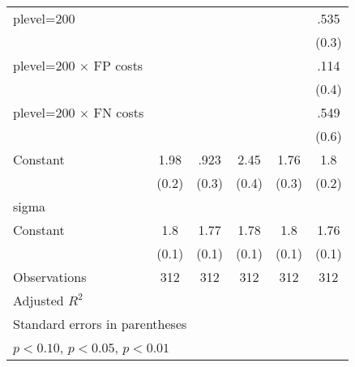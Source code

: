\begin{table}[htbp]
\begin{tabular}{l*{5}{c}}
plevel=200      &                  &                  &                  &                  &     .535\sym{*}  \\
                &                  &                  &                  &                  &    (0.3)         \\
plevel=200 $\times$ FP costs&                  &                  &                  &                  &     .114         \\
                &                  &                  &                  &                  &    (0.4)         \\
plevel=200 $\times$ FN costs&                  &                  &                  &                  &     .549         \\
                &                  &                  &                  &                  &    (0.6)         \\
Constant        &     1.98\sym{***}&     .923\sym{***}&     2.45\sym{***}&     1.76\sym{***}&      1.8\sym{***}\\
                &    (0.2)         &    (0.3)         &    (0.4)         &    (0.3)         &    (0.2)         \\
\hline
sigma           &                  &                  &                  &                  &                  \\
Constant        &      1.8\sym{***}&     1.77\sym{***}&     1.78\sym{***}&      1.8\sym{***}&     1.76\sym{***}\\
                &    (0.1)         &    (0.1)         &    (0.1)         &    (0.1)         &    (0.1)         \\
\hline
Observations    &      312         &      312         &      312         &      312         &      312         \\
Adjusted \(R^{2}\)&                  &                  &                  &                  &                  \\
\hline\hline
\multicolumn{6}{l}{\footnotesize Standard errors in parentheses}\\
\multicolumn{6}{l}{\footnotesize \sym{*} \(p<0.10\), \sym{**} \(p<0.05\), \sym{***} \(p<0.01\)}\\
\end{tabular}
\end{table}
